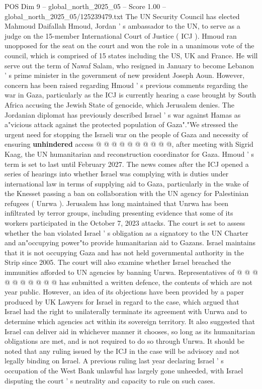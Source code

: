 \begin{textsample}{POS Dim 9 – global\_north\_2025\_05 – Score 1.00 – global\_north\_2025\_05/125239479.txt}  \label{ex:f9_pos_365}
The UN Security Council has elected Mahmoud Daifallah Hmoud, Jordan ' s ambassador to the UN, to serve as a judge on the 15-member International Court of Justice ( ICJ ).
Hmoud ran unopposed for the seat on the court and won the role in a unanimous vote of the council, which is comprised of 15 states including the US, UK and France.
He will serve out the term of Nawaf Salam, who resigned in January to become Lebanon ' s prime minister in the government of new president Joseph Aoun.
However, concern has been raised regarding Hmoud ' s previous comments regarding the war in Gaza, particularly as the ICJ is currently hearing a case brought by South Africa accusing the Jewish State of genocide, which Jerusalem denies.
The Jordanian diplomat has previously described Israel ' s war against Hamas as a"vicious attack against the protected population of Gaza"."We stressed the urgent need for stopping the Israeli war on the people of Gaza and necessity of ensuring \textbf{unhindered} access @ @ @ @ @ @ @ @ @ @, after meeting with Sigrid Kaag, the UN humanitarian and reconstruction coordinator for Gaza.
Hmoud ' s term is set to last until February 2027.
The news comes after the ICJ opened a series of hearings into whether Israel was complying with is duties under international law in terms of supplying aid to Gaza, particularly in the wake of the Knesset passing a ban on collaboration with the UN agency for Palestinian refugees ( Unrwa ).
Jerusalem has long maintained that Unrwa has been infiltrated by terror groups, including presenting evidence that some of its workers participated in the October 7, 2023 attacks.
The court is set to assess whether the ban violated Israel ' s obligation as a signatory to the UN Charter and an"occupying power"to provide humanitarian aid to Gazans.
Israel maintains that it is not occupying Gaza and has not held governmental authority in the Strip since 2005.
The court will also examine whether Israel breached the immunities afforded to UN agencies by banning Unrwa.
Representatives of @ @ @ @ @ @ @ @ @ @ has submitted a written defence, the contents of which are not year public.
However, an idea of its objections have been provided by a paper produced by UK Lawyers for Israel in regard to the case, which argued that Israel had the right to unilaterally terminate its agreement with Unrwa and to determine which agencies act within its sovereign territory.
It also suggested that Israel can deliver aid in whichever manner it chooses, so long as its humanitarian obligations are met, and is not required to do so through Unrwa.
It should be noted that any ruling issued by the ICJ in the case will be advisory and not legally binding on Israel.
A previous ruling last year declaring Israel ' s occupation of the West Bank unlawful has largely gone unheeded, with Israel disputing the court ' s neutrality and capacity to rule on such cases.

\end{textsample}
